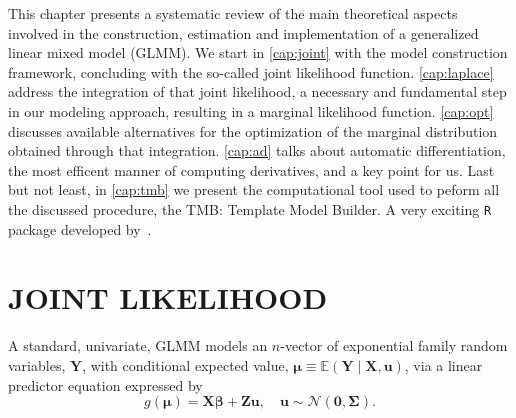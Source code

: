 This chapter presents a systematic review of the main theoretical
aspects involved in the construction, estimation and implementation of a
generalized linear mixed model (GLMM). We start in \autoref{cap:joint}
with the model construction framework, concluding with the so-called
joint likelihood function. \autoref{cap:laplace} address the integration
of that joint likelihood, a necessary and fundamental step in our
modeling approach, resulting in a marginal likelihood function.
\autoref{cap:opt} discusses available alternatives for the optimization
of the marginal distribution obtained through that integration.
\autoref{cap:ad} talks about automatic differentiation, the most
efficent manner of computing derivatives, and a key point for us. Last
but not least, in \autoref{cap:tmb} we present the computational tool
used to peform all the discussed procedure, the TMB: Template Model
Builder. A very exciting \texttt{R} \cite{R18} package developed
by~.

\section{JOINT LIKELIHOOD}
\label{cap:joint}

A standard, univariate, GLMM models an \(n\)-vector of exponential
family random variables, \(\mathbf{Y}\), with conditional expected
value, \(\bm{\mu} \equiv \mathbb{E}(\mathbf{Y} \mid \mathbf{X},
\mathbf{u})\), via a linear predictor equation expressed by
\begin{equation}
  g(\bm{\mu}) = \mathbf{X} \bm{\beta} + \mathbf{Zu}, \quad
  \mathbf{u} \sim \mathcal{N}(\mathbf{0}, \bm{\Sigma}).
  \label{eq:gmu}
\end{equation}

